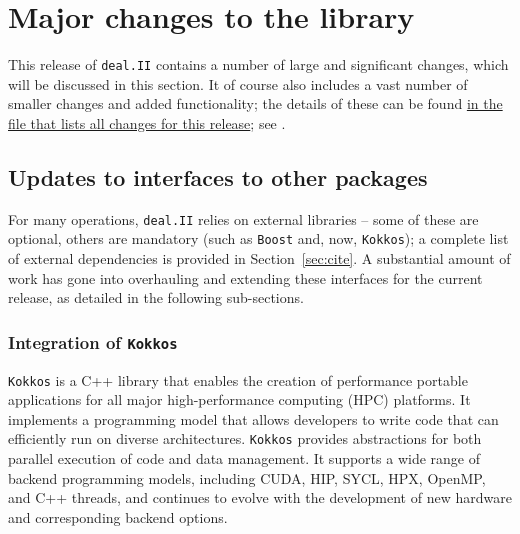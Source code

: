 \documentclass{ansarticle-preprint}
\newcommand{\specialword}[1]{\texttt{#1}}
\newcommand{\dealii}{{\specialword{deal.II}}\xspace}
\newcommand{\boost}{{\specialword{Boost}}\xspace}
\newcommand{\kokkos}{{\specialword{Kokkos}}\xspace}
\begin{document}
\section{Major changes to the library}
\label{sec:major}

This release of \dealii contains a number of large and significant changes,
which will be discussed in this section.
It of course also includes a
vast number of smaller changes and added functionality; the details of these
can be found
\href{https://dealii.org/developer/doxygen/deal.II/changes_between_9_4_2_and_9_5_0.html}
{in the file that lists all changes for this release}; see \cite{changes95}.


\subsection{Updates to interfaces to other packages}\label{sec:external}

For many operations, \dealii{} relies on external libraries -- some of
these are optional, others are mandatory (such as \boost and, now,
\kokkos); a complete list of external dependencies is provided in
Section~\ref{sec:cite}. A substantial amount of work has gone into
overhauling and extending these interfaces for the current release, as
detailed in the following sub-sections.


\subsubsection{Integration of \kokkos}\label{sec:kokkos}

\kokkos \cite{trott2022} is a C++ library that enables the creation of
performance portable applications for all major high-performance computing (HPC)
platforms. It implements a programming model that allows developers to write
code that can efficiently run on diverse architectures. \kokkos provides
abstractions for both parallel execution of code and data management. It
supports a wide range of backend programming models, including CUDA, HIP, SYCL,
HPX, OpenMP, and C++ threads, and continues to evolve with the development of
new hardware and corresponding backend options.
\end{document}
